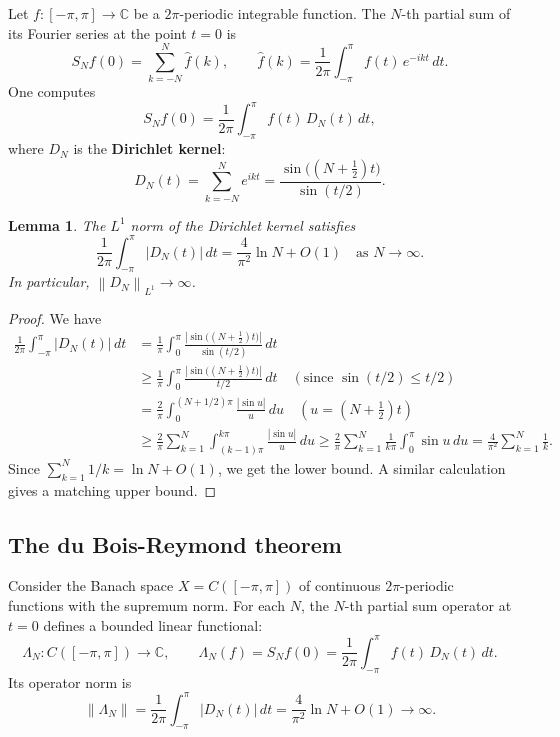 \documentclass[a4paper,12pt]{book}
\newcommand{\C}{\mathbb{C}}
\newcommand{\norm}[1]{\left\| #1 \right\|}
\newcommand{\abs}[1]{\left| #1 \right|}
\theoremstyle{definition}
\theoremstyle{plain}
\newtheorem{lemma}[definition]{Lemma}
\theoremstyle{remark}
\begin{document}
Let $f \colon [-\pi, \pi] \to \C$ be a $2\pi$-periodic integrable function.
The $N$-th partial sum of its Fourier series at
the point $t = 0$ is
\[
  S_N f(0) = \sum_{k=-N}^{N} \hat{f}(k),
  \qquad \hat{f}(k) = \frac{1}{2\pi} \int_{-\pi}^{\pi} f(t)\, e^{-ikt}\, dt.
\]
One computes
\[
  S_N f(0) = \frac{1}{2\pi} \int_{-\pi}^{\pi} f(t)\, D_N(t)\, dt,
\]
where $D_N$ is the \textbf{Dirichlet kernel}:
\[
  D_N(t) = \sum_{k=-N}^{N} e^{ikt} = \frac{\sin\bigl((N+\tfrac{1}{2})t\bigr)}%
  {\sin(t/2)}.
\]

\begin{lemma}\label{lem:dirichlet-L1-norm}
The $L^1$ norm of the Dirichlet kernel satisfies
\[
  \frac{1}{2\pi}\int_{-\pi}^{\pi} \abs{D_N(t)}\, dt
  = \frac{4}{\pi^2} \ln N + O(1) \quad \text{as } N \to \infty.
\]
In particular, $\norm{D_N}_{L^1} \to \infty$.
\end{lemma}

\begin{proof}
We have
\begin{align*}
  \frac{1}{2\pi}\int_{-\pi}^{\pi} \abs{D_N(t)}\, dt
  &= \frac{1}{\pi}\int_{0}^{\pi}
    \frac{\abs{\sin\bigl((N+\tfrac{1}{2})t\bigr)}}{\sin(t/2)}\, dt \\
  &\geq \frac{1}{\pi}\int_{0}^{\pi}
    \frac{\abs{\sin\bigl((N+\tfrac{1}{2})t\bigr)}}{t/2}\, dt
    \quad (\text{since } \sin(t/2) \leq t/2) \\
  &= \frac{2}{\pi}\int_{0}^{(N+1/2)\pi}
    \frac{\abs{\sin u}}{u}\, du
    \quad (u = (N+\tfrac{1}{2})t) \\
  &\geq \frac{2}{\pi}\sum_{k=1}^{N} \int_{(k-1)\pi}^{k\pi}
    \frac{\abs{\sin u}}{u}\, du
  \geq \frac{2}{\pi}\sum_{k=1}^{N} \frac{1}{k\pi}
    \int_{0}^{\pi} \sin u\, du
  = \frac{4}{\pi^2}\sum_{k=1}^{N} \frac{1}{k}.
\end{align*}
Since $\sum_{k=1}^N 1/k = \ln N + O(1)$, we get the lower bound. A similar
calculation gives a matching upper bound.
\end{proof}

\subsection{The du Bois-Reymond theorem}

Consider the Banach space $X = C([-\pi,\pi])$ of continuous
$2\pi$-periodic functions with the supremum norm. For each $N$, the $N$-th partial
sum operator at $t = 0$ defines a bounded linear functional:
\[
  \Lambda_N \colon C([-\pi,\pi]) \to \C,
  \qquad \Lambda_N(f) = S_N f(0) = \frac{1}{2\pi}
  \int_{-\pi}^{\pi} f(t)\, D_N(t)\, dt.
\]
Its operator norm is
\[
  \norm{\Lambda_N} = \frac{1}{2\pi}\int_{-\pi}^{\pi} \abs{D_N(t)}\, dt
  = \frac{4}{\pi^2}\ln N + O(1) \to \infty.
\]
\end{document}
